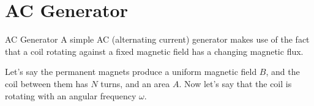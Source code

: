 \documentclass[12pt,aspectratio=169]{beamer}
\begin{document}
%    



\section{AC Generator}

\begin{frame}{AC Generator}
  A simple AC (alternating current) generator makes use of the fact that a 
  coil rotating against a fixed magnetic field has a changing magnetic flux.
  \begin{center}
  \end{center}
  Let's say the permanent magnets produce a uniform magnetic field $B$, and the
  coil between them has $N$ turns, and an area $A$. Now let's say that the coil
  is rotating with an angular frequency $\omega$.
\end{frame}
\end{document}
